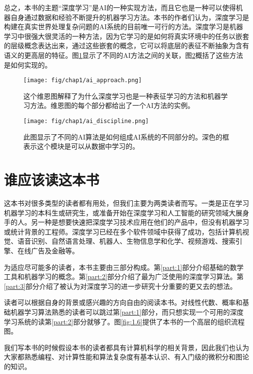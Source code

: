 总之，本书的主题“深度学习”是AI的一种实现方法，而且它也是一种可以使得机器自身通过数据和经验不断提升的机器学习方法。本书的作者们认为，深度学习是构建在真实世界处理复杂问题的AI系统的目前唯一可行的方法。深度学习是机器学习中很强大很灵活的一种方法，因为它学习的是如何将真实环境中的任务以嵌套的层级概念表达出来，通过这些嵌套的概念，它可以将底层的表征不断抽象为含有语义的更高层的特征。图\ref{fig:ai_approach}显示了不同的AI方法之间的关联，图\ref{fig:ai_discipline}概括了这些方法是如何实现的。

\begin{figure}[htbp] %
   \centering
   \texttt{[image: fig/chap1/ai\_approach.png]} 
   \caption{这个维恩图解释了为什么深度学习也是一种表征学习的方法和机器学习方法。维恩图的每个部分都给出了一个AI方法的实例。}
   \label{fig:ai_approach}
\end{figure}

\begin{figure}[htbp] %
   \centering
   \texttt{[image: fig/chap1/ai\_discipline.png]} 
   \caption{此图显示了不同的AI算法是如何组成AI系统的不同部分的。深色的框表示这个模块是可以从数据中学习的。}
   \label{fig:ai_discipline}
\end{figure}

\section{谁应该读这本书}

这本书对很多类型的读者都有用处，但我们主要为两类读者而写。一类是正在学习机器学习的本科生或研究生，或准备开始在深度学习和人工智能的研究领域大展身手的人。另一种是想要快速把深度学习技术应用在他们的产品中，但没有机器学习或统计背景的工程师。深度学习已经在多个软件领域中获得了成功，包括计算机视觉、语音识别、自然语言处理、机器人、生物信息学和化学、视频游戏、搜索引擎、在线广告及金融等。


为适应尽可能多的读者，本书主要由三部分构成。第\ref{part:1}部分介绍基础的数学工具和机器学习的概念。第\ref{part:2}部分介绍了最为广泛使用的深度学习算法。第\ref{part:3}部分介绍了被认为对深度学习的进一步研究十分重要的更又去的想法。


读者可以根据自身的背景或感兴趣的方向自由的阅读本书。对线性代数、概率和基础机器学习算法熟悉的读者可以跳过第\ref{part:1}部分，而只想实现一个可用的深度学习系统的读第\ref{part:2}部分就够了。图\ref{fig:1.6}提供了本书的一个高层的组织流程图。


我们写本书的时候假设本书的读者都具有计算机科学的相关背景，因此我们也认为大家都熟悉编程、对计算性能和算法复杂度有基本认识、有入门级的微积分和图论的知识。

